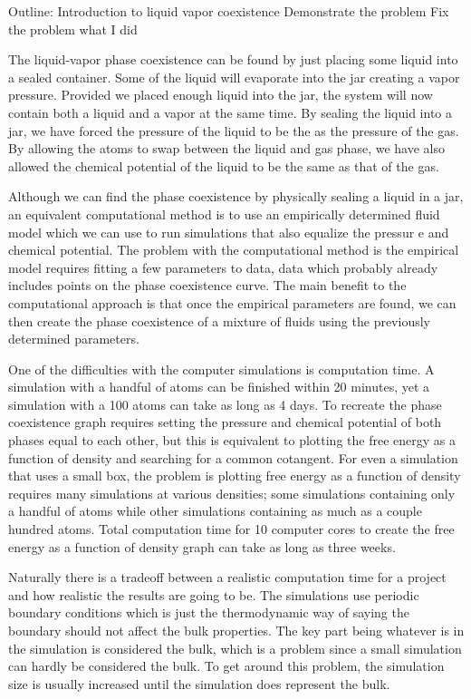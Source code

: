 Outline:
Introduction to liquid vapor coexistence
Demonstrate the problem
Fix the problem
what I did

The liquid-vapor phase coexistence can be found by just placing some liquid into a sealed container. Some of the liquid will evaporate into the jar creating a vapor pressure. Provided we placed enough liquid into the jar, the system will now contain both a liquid and a vapor at the same time. By sealing the liquid into a jar, we have forced the pressure of the liquid to be the as the pressure of the gas. By allowing the atoms to swap between the liquid and gas phase, we have also allowed the chemical potential of the liquid to be the same as that of the gas.

Although we can find the phase coexistence by physically sealing a liquid in a jar, an equivalent computational method is to use an empirically determined fluid model which we can use to run simulations that also equalize the pressur
e and chemical potential. The problem with the computational method is the empirical model requires fitting a few parameters to data, data which probably already includes points on the phase coexistence curve. The main benefit to the computational approach is that once the empirical parameters are found, we can then create the phase coexistence of a mixture of fluids using the previously determined parameters.

One of the difficulties with the computer simulations is computation time. A simulation with a handful of atoms can be finished within 20 minutes, yet a simulation with a 100 atoms can take as long as 4 days. To recreate the phase coexistence graph requires setting the pressure and chemical potential of both phases equal to each other, but this is equivalent to plotting the free energy as a function of density and searching for a common cotangent. For even a simulation that uses a small box, the problem is plotting free energy as a function of density requires many simulations at various densities; some simulations containing only a handful of atoms while other simulations containing as much as a couple hundred atoms. Total computation time for 10 computer cores to create the free energy as a function of density graph can take as long as three weeks.

Naturally there is a tradeoff between a realistic computation time for a project and how realistic the results are going to be. The simulations use periodic boundary conditions which is just the thermodynamic way of saying the boundary should not affect the bulk properties. The key part being whatever is in the simulation is considered the bulk, which is a problem since a small simulation can hardly be considered the bulk. To get around this problem, the simulation size is usually increased until the simulation does represent the bulk. 

